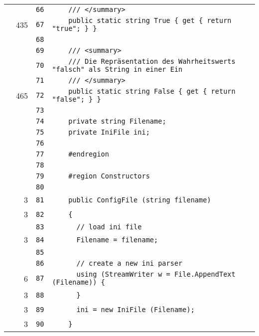 \documentclass[a4paper,10pt]{article}
\begin{document}
\begin{longtable}[l]{lrrl}
\cellcolor{gray} &  & \verb~66~ & \verb~    /// </summary>~\\
\cellcolor{green} & 435 & \verb~67~ & \verb~    public static string True { get { return "true"; } }~\\
\cellcolor{gray} &  & \verb~68~ & \verb~~\\
\cellcolor{gray} &  & \verb~69~ & \verb~    /// <summary>~\\
\cellcolor{gray} &  & \verb~70~ & \verb~    /// Die Repräsentation des Wahrheitswerts "falsch" als String in einer Ein~\\
\cellcolor{gray} &  & \verb~71~ & \verb~    /// </summary>~\\
\cellcolor{green} & 465 & \verb~72~ & \verb~    public static string False { get { return "false"; } }~\\
\cellcolor{gray} &  & \verb~73~ & \verb~~\\
\cellcolor{gray} &  & \verb~74~ & \verb~    private string Filename;~\\
\cellcolor{gray} &  & \verb~75~ & \verb~    private IniFile ini;~\\
\cellcolor{gray} &  & \verb~76~ & \verb~~\\
\cellcolor{gray} &  & \verb~77~ & \verb~    #endregion~\\
\cellcolor{gray} &  & \verb~78~ & \verb~~\\
\cellcolor{gray} &  & \verb~79~ & \verb~    #region Constructors~\\
\cellcolor{gray} &  & \verb~80~ & \verb~~\\
\cellcolor{green} & 3 & \verb~81~ & \verb~    public ConfigFile (string filename)~\\
\cellcolor{green} & 3 & \verb~82~ & \verb~    {~\\
\cellcolor{gray} &  & \verb~83~ & \verb~      // load ini file~\\
\cellcolor{green} & 3 & \verb~84~ & \verb~      Filename = filename;~\\
\cellcolor{gray} &  & \verb~85~ & \verb~~\\
\cellcolor{gray} &  & \verb~86~ & \verb~      // create a new ini parser~\\
\cellcolor{green} & 6 & \verb~87~ & \verb~      using (StreamWriter w = File.AppendText (Filename)) {~\\
\cellcolor{green} & 3 & \verb~88~ & \verb~      }~\\
\cellcolor{green} & 3 & \verb~89~ & \verb~      ini = new IniFile (Filename);~\\
\cellcolor{green} & 3 & \verb~90~ & \verb~    }~\\

\end{longtable}
\end{document}
